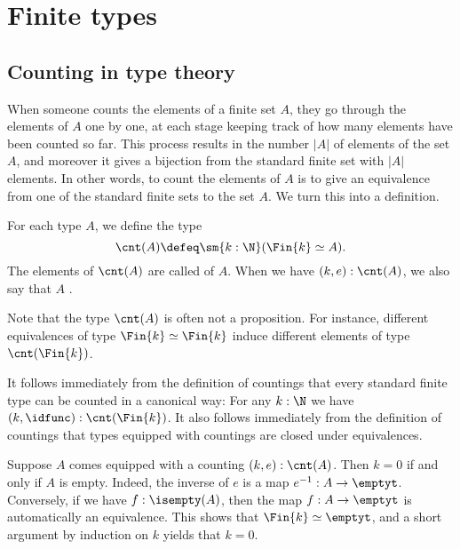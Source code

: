 \section{Finite types}\label{chap:finite}

\subsection{Counting in type theory}
When someone counts the elements of a finite set $A$, they go through the elements of $A$ one by one, at each stage keeping track of how many elements have been counted so far. This process results in the number $|A|$ of elements of the set $A$, and moreover it gives a bijection from the standard finite set with $|A|$ elements. In other words, to count the elements of $A$ is to give an equivalence from one of the standard finite sets to the set $A$. We turn this into a definition.

\begin{defn}
  For each type $A$, we define the type
  \begin{equation*}
    \cnt(A)\defeq\sm{k:\N}(\Fin{k}\simeq A).
  \end{equation*}
  The elements of $\cnt(A)$ are called  of $A$. When we have $(k,e):\cnt(A)$, we also say that $A$ .
\end{defn}

Note that the type $\cnt(A)$ is often not a proposition. For instance, different equivalences of type $\Fin{k}\simeq\Fin{k}$ induce different elements of type $\cnt(\Fin{k})$.

\begin{eg}
  It follows immediately from the definition of countings that every standard finite type can be counted in a canonical way: For any $k:\N$ we have $(k,\idfunc) : \cnt(\Fin{k})$. It also follows immediately from the definition of countings that types equipped with countings are closed under equivalences.
\end{eg}

\begin{eg}
  Suppose $A$ comes equipped with a counting $(k,e):\cnt(A)$. Then $k=0$ if and only if $A$ is empty. Indeed, the inverse of $e$ is a map $e^{-1}:A\to\emptyt$. Conversely, if we have $f:\isempty(A)$, then the map $f:A\to\emptyt$ is automatically an equivalence. This shows that $\Fin{k}\simeq\emptyt$, and a short argument by induction on $k$ yields that $k=0$. 
\end{eg}

